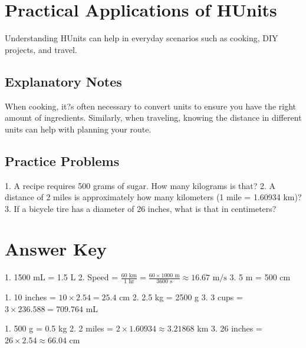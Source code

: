 \documentclass{article}
\begin{document}
\section*{Practical Applications of HUnits}
Understanding HUnits can help in everyday scenarios such as cooking, DIY projects, and travel.

\subsection*{Explanatory Notes}
When cooking, it?s often necessary to convert units to ensure you have the right amount of ingredients. Similarly, when traveling, knowing the distance in different units can help with planning your route.

\subsection*{Practice Problems}
1. A recipe requires 500 grams of sugar. How many kilograms is that?
2. A distance of 2 miles is approximately how many kilometers (1 mile = 1.60934 km)?
3. If a bicycle tire has a diameter of 26 inches, what is that in centimeters?

\section*{Answer Key}
1. 1500 mL = 1.5 L
2. Speed = \( \frac{60 \text{ km}}{1 \text{ hr}} = \frac{60 \times 1000 \text{ m}}{3600 \text{ s}} \approx 16.67 \text{ m/s} \)
3. 5 m = 500 cm

1. 10 inches = \( 10 \times 2.54 = 25.4 \) cm
2. 2.5 kg = 2500 g
3. 3 cups = \( 3 \times 236.588 = 709.764 \) mL

1. 500 g = 0.5 kg
2. 2 miles = \( 2 \times 1.60934 \approx 3.21868 \) km
3. 26 inches = \( 26 \times 2.54 \approx 66.04 \) cm
\end{document}
